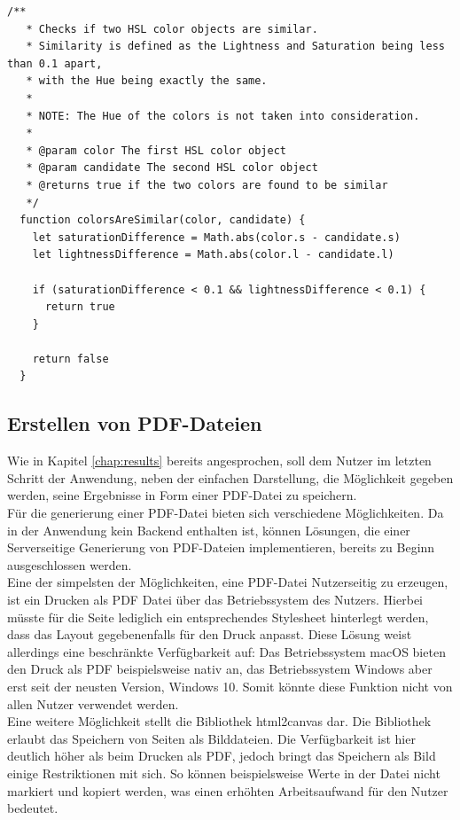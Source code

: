 \begin{lstlisting}[caption=Überprüfen der Ähnlichkeit zweier Farben, label=lst:similar]
  /**
   * Checks if two HSL color objects are similar.
   * Similarity is defined as the Lightness and Saturation being less than 0.1 apart,
   * with the Hue being exactly the same.
   *
   * NOTE: The Hue of the colors is not taken into consideration.
   *
   * @param color The first HSL color object
   * @param candidate The second HSL color object
   * @returns true if the two colors are found to be similar
   */
  function colorsAreSimilar(color, candidate) {
    let saturationDifference = Math.abs(color.s - candidate.s)
    let lightnessDifference = Math.abs(color.l - candidate.l)

    if (saturationDifference < 0.1 && lightnessDifference < 0.1) {
      return true
    }

    return false
  }
\end{lstlisting}


\subsection{Erstellen von PDF-Dateien}
Wie in Kapitel \ref{chap:results} bereits angesprochen, soll dem Nutzer im letzten Schritt der Anwendung, neben der einfachen Darstellung, die Möglichkeit gegeben werden, seine Ergebnisse in Form einer PDF-Datei zu speichern.\\
Für die generierung einer PDF-Datei bieten sich verschiedene Möglichkeiten. Da in der Anwendung kein Backend enthalten ist, können Lösungen, die einer Serverseitige Generierung von PDF-Dateien implementieren, bereits zu Beginn ausgeschlossen werden.\\

Eine der simpelsten der Möglichkeiten, eine PDF-Datei Nutzerseitig zu erzeugen, ist ein Drucken als PDF Datei über das Betriebssystem des Nutzers. Hierbei müsste für die Seite lediglich ein entsprechendes Stylesheet hinterlegt werden, dass das Layout gegebenenfalls für den Druck anpasst. Diese Lösung weist allerdings eine beschränkte Verfügbarkeit auf: Das Betriebssystem macOS bieten den Druck als PDF beispielsweise nativ an, das Betriebssystem Windows aber erst seit der neusten Version, Windows 10. Somit könnte diese Funktion nicht von allen Nutzer verwendet werden.\\

Eine weitere Möglichkeit stellt die Bibliothek html2canvas\footnotemark{} dar. Die Bibliothek erlaubt das Speichern von Seiten als Bilddateien. Die Verfügbarkeit ist hier deutlich höher als beim Drucken als PDF, jedoch bringt das Speichern als Bild einige Restriktionen mit sich. So können beispielsweise Werte in der Datei nicht markiert und kopiert werden, was einen erhöhten Arbeitsaufwand für den Nutzer bedeutet.

